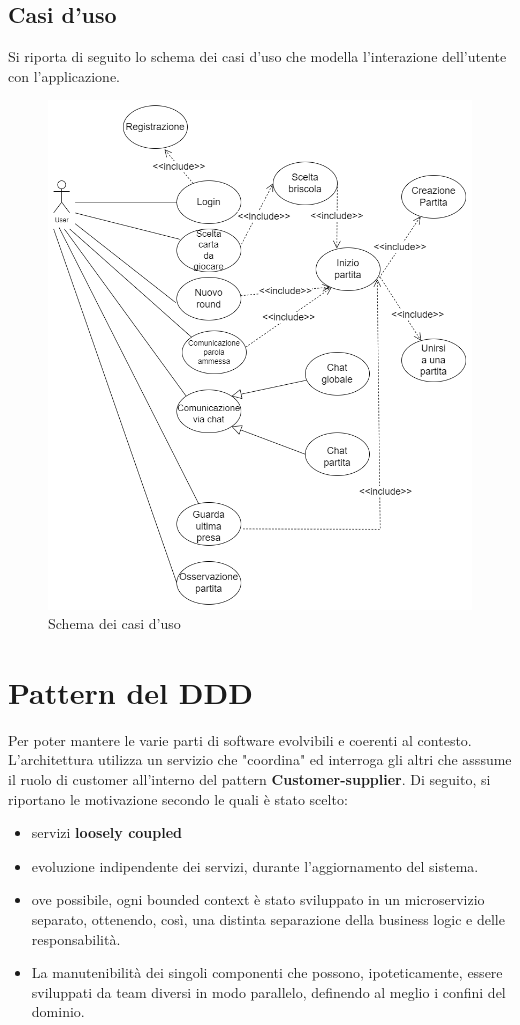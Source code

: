 \subsection{Casi d'uso}
Si riporta di seguito lo schema dei casi d'uso che modella l'interazione dell'utente con l'applicazione.
\begin{figure}[h!]
\centering 
\includegraphics[scale=0.45]{report/img/Casi_duso.png}
\caption{Schema dei casi d'uso}
\label{use_case}
\end{figure}

\section{Pattern del DDD}

Per poter mantere le varie parti di software evolvibili e coerenti al contesto. L'architettura utilizza un servizio che "coordina" ed interroga gli altri che asssume il ruolo di customer
all'interno del pattern \textbf{Customer-supplier}.
Di seguito, si riportano le motivazione secondo le quali è stato scelto:
\begin{itemize}
    \item servizi \textbf{loosely coupled}
    \item evoluzione indipendente dei servizi, durante l'aggiornamento del sistema.
    \item ove possibile, ogni bounded context è stato sviluppato in un microservizio separato, ottenendo, così, una distinta separazione della business logic e delle responsabilità. 
    \item La manutenibilità dei singoli componenti che possono, ipoteticamente, essere sviluppati da team diversi in modo parallelo, definendo al meglio i confini del dominio.
\end{itemize}

